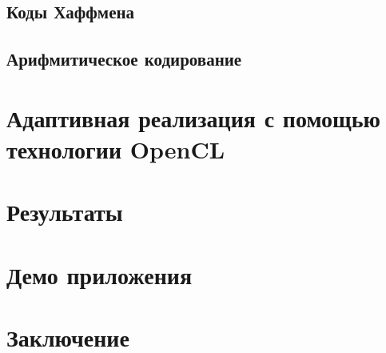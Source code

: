 \documentclass{matmex-diploma-custom}
\begin{document}
\subsection{Коды Хаффмена}
\subsection{Арифмитическое кодирование}
\section{Адаптивная реализация с помощью технологии OpenCL}
\section{Результаты}
\section{Демо приложения}

\section*{Заключение}



\end{document}
